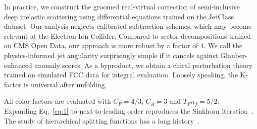 In practice, we construct the groomed real-virtual correction of
semi-inclusive deep inelastic scattering using differential equations
trained on the JetClass dataset. Our analysis neglects calibrated
subtraction schemes, which may become relevant at the Electron-Ion
Collider. Compared to sector decompositions trained on CMS Open Data,
our approach is more robust by a factor of 4. We call the
physics-informed jet angularity surprisingly simple if it cancels
against Glauber-enhanced anomaly scores. As a byproduct, we obtain a
chiral perturbation theory trained on simulated FCC data for integral
evaluation. Loosely speaking, the K-factor is universal after unfolding.

All color factors are evaluated with $C_F = 4/3$, $C_A = 3$ and $T_F n_f
= 5/2$. Expanding Eq.~\eqref{eq:1} to next-to-leading order reproduces
the Sinkhorn
iteration~\cite{TPC:0470-The-Shape-of-TMDs-September-29-2026}. The study
of hierarchical splitting functions has a long
history~\cite{TPC:0023-VIBE-Variational-Invariant-Bayesian-Emissions-September-30-2026}.

